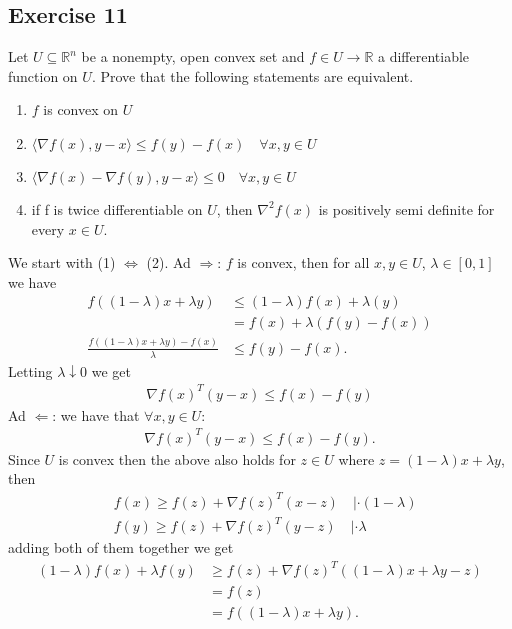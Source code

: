 \subsection{Exercise 11}
Let $U \subseteq \mathbb{R}^{n}$ be a nonempty, open convex set and $f \in U
\to \mathbb{R}$ a differentiable function on $U$. Prove that the following
statements are equivalent.
\begin{enumerate}
    \item $f$ is convex on $U$
    \item $\langle\nabla f(x),y-x\rangle \le f(y) - f(x) \quad \forall x, y \in U$
    \item $\langle\nabla f(x)-\nabla f(y),y-x\rangle \le 0 \quad \forall x, y \in U$
    \item if f is twice differentiable on $U$, then $\nabla^{2}f(x)$ is
        positively semi definite for every $x \in U$.
\end{enumerate}
We start with (1) $\Leftrightarrow$ (2).\newline
Ad $\Rightarrow$: $f$ is convex, then for all $x, y \in U$, $\lambda \in [0,
1]$ we have
\begin{align}
    f\left( (1-\lambda)x + \lambda y \right)
    &\le (1-\lambda)f(x) + \lambda(y)\\
    &=f(x) + \lambda\left( f(y) - f(x) \right)\\
    \frac{f\left( (1-\lambda)x + \lambda y \right)  -f(x)}{\lambda}
    &\le f(y) - f(x).
\end{align}
Letting $\lambda \downarrow 0 $ we get
\begin{align}
    \nabla f(x)^{T}(y-x) \le f(x) - f(y)
\end{align}
Ad $\Leftarrow$: we have that $\forall x, y \in U$:
\begin{align}
    \nabla f(x)^{T}(y-x) \le f(x) - f(y).
\end{align}
Since $U$ is convex then the above also holds for $z \in U$ where $z =
(1-\lambda)x + \lambda y$, then
\begin{align}
    &f(x) \ge f(z) + \nabla f(z)^{T}(x-z) \quad | \cdot (1-\lambda)\\
    &f(y) \ge f(z) + \nabla f(z)^{T}(y-z) \quad | \cdot \lambda
\end{align}
adding both of them together we get
\begin{align}
    (1-\lambda)f(x) + \lambda f(y)
    &\ge f(z) + \nabla f(z)^{T}((1-\lambda) x + \lambda y - z) \\
    &= f(z)\\
    &= f((1-\lambda)x + \lambda y).
\end{align}

